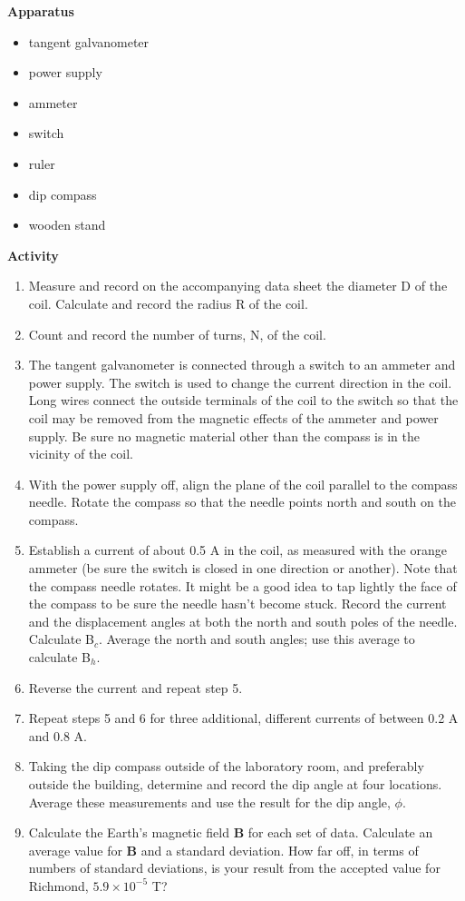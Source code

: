 \textbf{Apparatus}

\begin{itemize}
\item tangent galvanometer 
\item power supply 
\item ammeter 
\item switch 
\item ruler 
\item dip compass 
\item wooden stand
\end{itemize}
\vspace{15mm}
\textbf{Activity}

\begin{enumerate}
\item Measure and record on the accompanying data sheet the diameter D of
the coil. Calculate and record the radius R of the coil.
\item Count and record the number of turns, N, of the coil.
\item The tangent galvanometer is connected through a switch to an ammeter
and power supply. The switch is used to change the current direction
in the coil. Long wires connect the outside terminals of the coil
to the switch so that the coil may be removed from the magnetic effects
of the ammeter and power supply. Be sure no magnetic material other
than the compass is in the vicinity of the coil.
\item With the power supply off, align the plane of the coil parallel to
the compass needle. Rotate the compass so that the needle points north
and south on the compass.
\item Establish a current of about 0.5 A in the coil, as measured with the
orange ammeter (be sure the switch is closed in one direction or another).
Note that the compass needle rotates. It might be a good idea to tap
lightly the face of the compass to be sure the needle hasn't become
stuck. Record the current and the displacement angles at both the
north and south poles of the needle. Calculate B\( _{c} \). Average
the north and south angles; use this average to calculate B\( _{h} \).
\item Reverse the current and repeat step 5.
\item Repeat steps 5 and 6 for three additional, different currents of between
0.2 A and 0.8 A.
\item Taking the dip compass outside of the laboratory room, and preferably
outside the building, determine and record the dip angle at four locations.
Average these measurements and use the result for the dip angle, \( \phi  \).
\item Calculate the Earth's magnetic field \textbf{B} for each set of data.
Calculate an average value for \textbf{B} and a standard deviation.
How far off, in terms of numbers of standard deviations, is your result
from the accepted value for Richmond, $5.9 \times 10^{-5}$ T?
\end{enumerate}
\hrulefill

